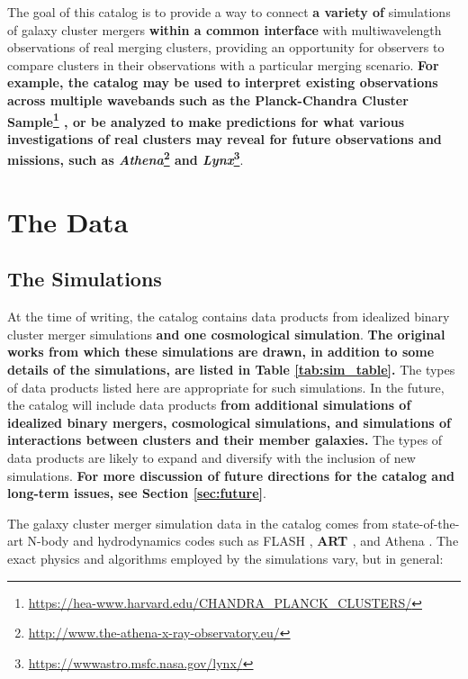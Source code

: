 \documentclass{emulateapj}
\begin{document}
The goal of this catalog is to provide a way to connect {\bf a variety of} simulations of galaxy cluster mergers {\bf within a common interface} with multiwavelength observations of real merging clusters, providing an opportunity for observers to compare clusters in their observations with a particular merging scenario. {\bf For example, the catalog may be used to interpret existing observations across multiple wavebands such as the Planck-Chandra Cluster Sample\footnote{\url{https://hea-www.harvard.edu/CHANDRA_PLANCK_CLUSTERS/}} \citep{jon16}, or be analyzed to make predictions for what various investigations of real clusters may reveal for future observations and missions, such as {\it Athena}\footnote{\url{http://www.the-athena-x-ray-observatory.eu/}} and {\it Lynx}\footnote{\url{https://wwwastro.msfc.nasa.gov/lynx/}}}.

\section{The Data}

\subsection{The Simulations}

At the time of writing, the catalog contains data products from idealized binary cluster merger simulations {\bf and one cosmological simulation}. {\bf The original works from which these simulations are drawn, in addition to some details of the simulations, are listed in Table \ref{tab:sim_table}.} The types of data products listed here are appropriate for such simulations. In the future, the catalog will include data products {\bf from additional simulations of idealized binary mergers, cosmological simulations, and simulations of interactions between clusters and their member galaxies.} The types of data products are likely to expand and diversify with the inclusion of new simulations. \textbf{For more discussion of future directions for the catalog and long-term issues, see Section \ref{sec:future}}.



The galaxy cluster merger simulation data in the catalog comes from state-of-the-art N-body and hydrodynamics codes such as FLASH \citep{dub09}, {\bf ART \citep{kra99, kra02, rud08}}, and Athena \citep{sto08}. The exact physics and algorithms employed by the simulations vary, but in general:
\end{document}
